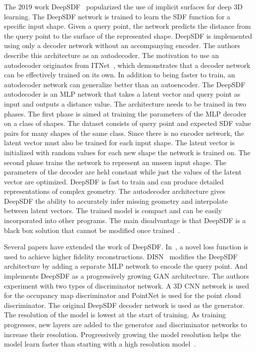 The 2019 work DeepSDF~\cite{Park2019} popularized the use of implicit surfaces for deep 3D learning. The DeepSDF network is trained to learn the SDF function for a specific input shape. Given a query point, the network predicts the distance from the query point to the surface of the represented shape. DeepSDF is implemented using only a decoder network without an accompanying encoder. The authors describe this architecture as an autodecoder. The motivation to use an autodecoder originates from ITNet~\cite{Tan1995}, which demonstrates that a decoder network can be effectively trained on its own. In addition to being faster to train, an autodecoder network can generalize better than an autoencoder. The DeepSDF autodecoder is an MLP network that takes a latent vector and query point as input and outputs a distance value. The architecture needs to be trained in two phases. The first phase is aimed at training the parameters of the MLP decoder on a class of shapes. The dataset consists of query point and expected SDF value pairs for many shapes of the same class. Since there is no encoder network, the latent vector must also be trained for each input shape. The latent vector is initialized with random values for each new shape the network is trained on. The second phase trains the network to represent an unseen input shape. The parameters of the decoder are held constant while just the values of the latent vector are optimized. DeepSDF is fast to train and can produce detailed representations of complex geometry. The autodecoder architecture gives DeepSDF the ability to accurately infer missing geometry and interpolate between latent vectors. The trained model is compact and can be easily incorporated into other programs. The main disadvantage is that DeepSDF is a black box solution that cannot be modified once trained~\cite{Park2019}.

Several papers have extended the work of DeepSDF. In~\cite{Gropp2020}, a novel loss function is used to achieve higher fidelity reconstructions. DISN~\cite{Xu2019} modifies the DeepSDF architecture by adding a separate MLP network to encode the query point. And \cite{Kleineberg2020} implements DeepSDF as a progressively growing GAN architecture. The authors experiment with two types of discriminator network. A 3D CNN network is used for the occupancy map discriminator and PointNet is used for the point cloud discriminator. The original DeepSDF decoder network is used as the generator. The resolution of the model is lowest at the start of training. As training progresses, new layers are added to the generator and discriminator networks to increase their resolution. Progressively growing the model resolution helps the model learn faster than starting with a high resolution model~\cite{Kleineberg2020}.


